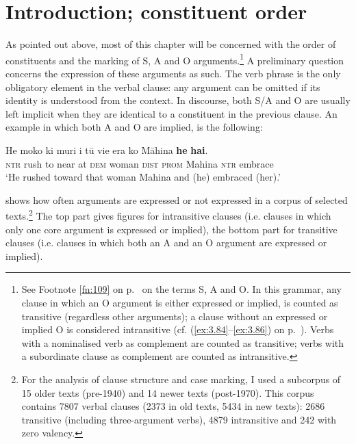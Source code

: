 \section{Introduction; constituent order}\label{sec:8.1}
As pointed out above, most of this chapter will be concerned with the order of constituents and the marking of S, A and O arguments.\footnote{\label{fn:379}See Footnote \ref{fn:109} on p.~\pageref{fn:109} on the terms S, A and O. In this grammar, any clause in which an O argument is either expressed or implied, is counted as transitive (regardless other arguments); a clause without an expressed or implied O is considered intransitive (cf. (\ref{ex:3.84}–\ref{ex:3.86}) on p.~\pageref{ex:3.84}). Verbs with a nominalised verb as complement are counted as transitive; verbs with a subordinate clause as complement are counted as intransitive.}  A preliminary question concerns the expression of these arguments as such. The verb phrase is the only obligatory element in the verbal clause: any argument can be omitted if its identity is understood from the context. In discourse, both S/A and O are usually left implicit when they are identical to a constituent in the previous clause. An example in which both A and O are implied, is the following:

\ea\label{ex:8.1}
\gll He moko ki muri i tū vi{\ꞌ}e era ko Māhina \textbf{he} \textbf{ha{\ꞌ}i}.\\
\textsc{ntr} rush to near at \textsc{dem} woman \textsc{dist} \textsc{prom} Mahina \textsc{ntr} embrace\\

\glt 
‘He rushed toward that woman Mahina and (he) embraced (her).’ \textstyleExampleref{[R399.191]} 
\z

 shows how often arguments are expressed or not expressed in a corpus of selected texts.\footnote{\label{fn:380}For the analysis of clause structure and case marking, I used a subcorpus of 15 older texts (pre-1940) and 14 newer texts (post-1970). This corpus contains 7807 verbal clauses (2373 in old texts, 5434 in new texts): 2686 transitive (including three-argument verbs), 4879 intransitive and 242 with zero valency.} The top part gives figures for intransitive clauses (i.e. clauses in which only one core argument is expressed or implied), the bottom part for transitive clauses (i.e. clauses in which both an A and an O argument are expressed or implied).

